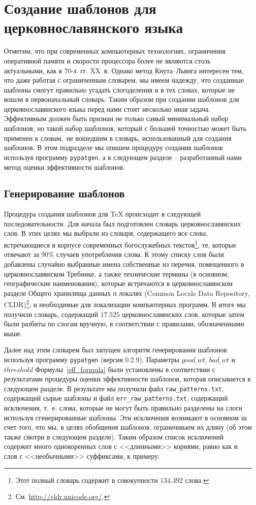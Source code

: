 \documentclass[12pt,a4paper,oneside]{extarticle}
\begin{document}
\section{Создание шаблонов для церковнославянского языка}

Отметим, что при современных компьютерных технологиях, ограничения оперативной памяти и скорости процессора более не являются столь актуальными, как в 70-х~гг. XX~в. Однако метод Кнута--Льянга интересен тем, что даже работая с ограниченным словарем, мы имеем надежду, что созданные шаблоны смогут правильно угадать слогоделения и в тех словах, которые не вошли в первоначальный словарь. Таким образом при создании шаблонов для церковнославянского языка перед нами стоит несколько иная задача. Эффективным должен быть признан не только самый минимальный набор шаблонов, но такой набор шаблонов, который с большей точностью может быть применен к словам, не вошедшим в словарь, использованный для создания шаблонов. В этом подразделе мы опишем процедуру создания шаблонов используя программу \verb+pypatgen+, а в следующем разделе -- разработанный нами метод оценки эффективности шаблонов.

\subsection{Генерирование шаблонов}

Процедура создания шаблонов для \TeX{} происходит в следующей последовательности. Для начала был подготовлен словарь церковнославянских слов. В этих целях мы выбрали из словаря, содержащего все слова, встречающиеся в корпусе современных богослужебных текстов\footnote{Этот полный словарь содержит в совокупности $134.392$ слова.}, те, которые отвечают за 90\% случаев употребления слова. К этому списку слов были добавлены случайно выбранные имена собственные из перечня, помещенного в церковнославянском Требнике, а также технические термины (в основном, географические наименования), которые встречаются в церковнославянском разделе Общего хранилища данных о локалях (\textenglish{Common Locale Data Repository}, CLDR)\footnote{См. \url{http://cldr.unicode.org/}.}, и необходимые для локализации компьютерных программ. В итоге мы получили словарь, содержащий $17.525$ церковнославянских слов, которые затем были разбиты по слогам вручную, в соответствии с правилами, обозначенными выше.

Далее над этим словарем был запущен алгоритм генерирования шаблонов используя программу \verb+pypatgen+ (версия 0.2.9). Параметры $good\_wt$, $bad\_wt$ и $threshold$ Формулы~\ref{eff_formula} были установлены в соответствии с результатами процедуры оценки эффективности шаблонов, которая описывается в следующем разделе. В результате мы получили файл \verb+raw_patterns.txt+, содержащий сырые шаблоны и файл \verb+err_raw_patterns.txt+, содержащий исключения, т.~е. слова, которые не могут быть правильно разделены на слоги используя сгенерированные шаблоны. Эти исключения возникают в основном за счет того, что мы, в целях обобщения шаблонов, ограничиваем их длину (об этом также смотри в следующем разделе). Таким образом список исключений содержит много однокоренных слов с <<длинными>> корнями, равно как и слов с <<необычными>> суффиксами, к примеру:
\end{document}
